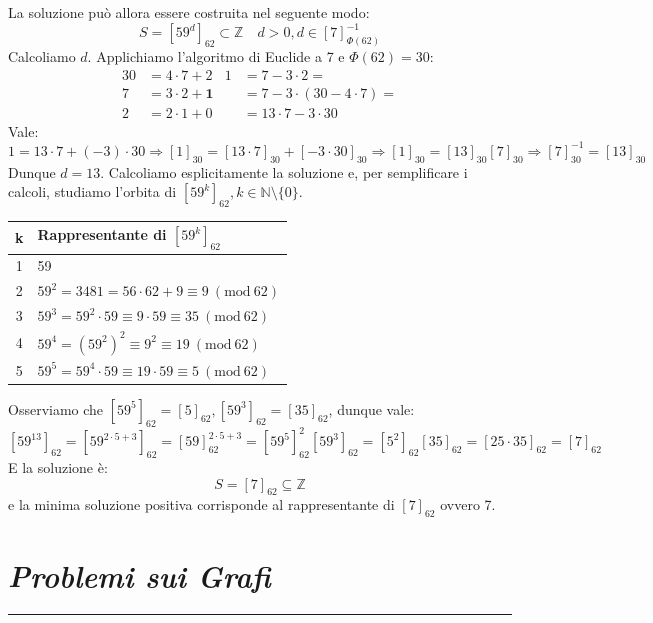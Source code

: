 \documentclass[oneside]{book}
\theoremstyle{remark}
\newcommand{\chptr}[1]{\chapter{\textit{#1}}\noindent\rule{\textwidth}{1pt}}
\newcommand{\Mod}[1]{\ (\mathrm{mod}\ #1)} %
\newcommand{\head}[1]{\textnormal{\textbf{#1}}} %
\begin{document}
\begin{tcolorbox}[colback=blue!30, colframe=blue!30!black]
    La soluzione può allora essere costruita nel
    seguente modo:
    \[ S=[59^d]_{62}\subset\mathbb{Z} \quad d>0, d\in[7]^{-1}_{\Phi(62)} \]
    Calcoliamo $d$. Applichiamo l'algoritmo di Euclide a 7 e $\Phi(62)=30$:
    \begin{align*}
    30 &=4\cdot7+2                & 1&=7-3\cdot2 =\\
    7  &=3\cdot2+\textbf{1}       &  &=7-3\cdot(30-4\cdot7)=\\
    2  &=2\cdot1+0                &  &=13\cdot7-3\cdot30
    \end{align*}
    Vale:
    \[ 1=13\cdot7+(-3)\cdot30 \Longrightarrow [1]_{30}=[13\cdot7]_{30}+[-3\cdot30]_{30} \Longrightarrow [1]_{30}=[13]_{30}[7]_{30} \Longrightarrow [7]^{-1}_{30}=[13]_{30} \]
    Dunque $d=13$. Calcoliamo esplicitamente la soluzione e, per semplificare i
    calcoli, studiamo l'orbita di $[59^k]_{62}, k\in\mathbb{N}\setminus\{0\}$.
    
    \begin{center}
    \begin{tabular}{c|l}
        \head{k} & \head{Rappresentante di $[59^k]_{62}$}\\
        \hline
        1        & 59\\
        2        & $59^2=3481=56\cdot62+9\equiv9 \Mod{62}$\\
        3        & $59^3=59^2\cdot59\equiv9\cdot59\equiv 35\Mod{62}$\\
        4        & $59^4=(59^2)^2\equiv9^2\equiv 19 \Mod{62}$\\
        5        & $59^5=59^4\cdot59\equiv19\cdot59\equiv 5\Mod{62}$\\
    \end{tabular}
    \end{center}
    
    Osserviamo che $[59^5]_{62}=[5]_{62}, [59^3]_{62}=[35]_{62}$, dunque
    vale:
    \[ [59^{13}]_{62}=[59^{2\cdot5+3}]_{62}=[59]^{2\cdot5+3}_{62}=[59^5]^2_{62}[59^3]_{62}=[5^2]_{62}[35]_{62}=[25\cdot35]_{62}=[7]_{62} \]
    E la soluzione è:
    \[ S=[7]_{62}\subseteq\mathbb{Z} \]
    e la minima soluzione positiva corrisponde al rappresentante di $[7]_{62}$
    ovvero 7.
\end{tcolorbox}





\chptr{Problemi sui Grafi}
\end{document}
